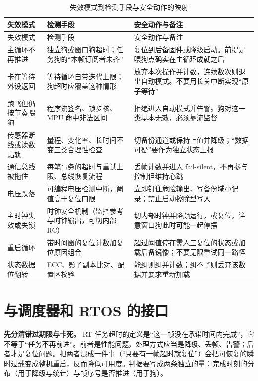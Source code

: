 \documentclass[12pt,a4paper,fontset=fandol]{ctexbook}
\begin{document}
\begin{longtable}{>{\raggedright\arraybackslash}p{} >{\raggedright\arraybackslash}p{} >{\raggedright\arraybackslash}p{}}
\caption{失效模式到检测手段与安全动作的映射}\label{tab:ch04-failure-map}\\
\toprule
失效模式 & 检测手段 & 安全动作与备注 \\
\midrule
\endfirsthead
\toprule
失效模式 & 检测手段 & 安全动作与备注 \\
\midrule
\endhead
\bottomrule
\endfoot
\endlastfoot
主循环不再推进 & 独立狗或窗口狗超时；任务狗的``本帧订阅者未齐'' & 复位到后备固件或降级启动。前提是喂狗点确实在主循环成就之后 \\
\addlinespace
卡在等待外设返回 & 等待循环自带迭代上限；狗超时应覆盖这种情形 & 放弃本次操作并计数，连续数次则退出自动模式。不要用长关中断实现``原子等待'' \\
\addlinespace
跑飞但仍按节奏喂狗 & 程序流签名、锁步核、MPU 命中非法区间 & 拒绝进入自动模式并告警。狗对这一类基本无效，必须靠流监督 \\
\addlinespace
传感器断线或读数贴轨 & 量程、变化率、长时间不变三类合理性检查 & 切备份通道或保持上值并降级；``数据可疑''要作为独立状态上报 \\
\addlinespace
通信总线被拖住 & 每笔事务的超时与重试上限、总线恢复流程 & 丢帧计数并进入 fail-silent，不再参与控制但维持心跳 \\
\addlinespace
电压跌落 & 可编程电压检测中断，阈值高于复位门限 & 立即钉住危险输出、写备份域小记录；禁止启动擦除型写入 \\
\addlinespace
主时钟失效或失锁 & 时钟安全机制（监控参考与时钟输出，可切内部 RC） & 切内部时钟并降频运行，或复位。注意窗口狗此时可能一起停摆 \\
\addlinespace
重启循环 & 带时间窗的复位计数加复位原因组合 & 超过阈值停在需人工复位的状态或加载后备镜像；不要无限重试同一路径 \\
\addlinespace
状态数据位翻转 & ECC、影子副本比对、配置区校验 & 能纠则纠并计数；纠不了则丢弃该数据并要求重新加载 \\
\end{longtable}

\section{与调度器和 RTOS 的接口}

\textbf{先分清错过期限与卡死。} RT 任务超时的定义是``这一帧没在承诺时间内完成''，它不等于``任务不再前进''。前者是性能问题，处理方式应当是降级、丢帧、告警；后者才是复位问题。把两者混成一件事（``只要有一帧超时就复位''）会把可恢复的瞬时过载变成整机重启，反而降低可用度。判据要写成两条独立的量：完成时刻的分布（用于降级与统计）与帧序号是否推进（用于狗）。
\end{document}
